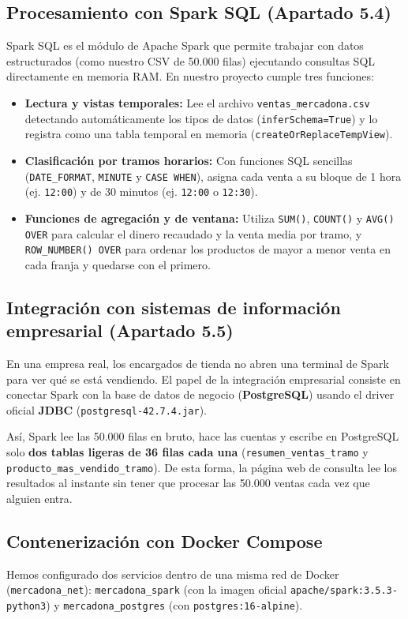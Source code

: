 \documentclass[a4paper,12pt]{article}
\begin{document}
\subsection{Procesamiento con Spark SQL (Apartado 5.4)}
Spark SQL es el módulo de Apache Spark que permite trabajar con datos estructurados (como nuestro CSV de 50.000 filas) ejecutando consultas SQL directamente en memoria RAM. En nuestro proyecto cumple tres funciones:
\begin{itemize}[leftmargin=1.0cm]
    \item \textbf{Lectura y vistas temporales:} Lee el archivo \texttt{ventas\_mercadona.csv} detectando automáticamente los tipos de datos (\texttt{inferSchema=True}) y lo registra como una tabla temporal en memoria (\texttt{createOrReplaceTempView}).
    \item \textbf{Clasificación por tramos horarios:} Con funciones SQL sencillas (\texttt{DATE\_FORMAT}, \texttt{MINUTE} y \texttt{CASE WHEN}), asigna cada venta a su bloque de 1 hora (ej. \texttt{12:00}) y de 30 minutos (ej. \texttt{12:00} o \texttt{12:30}).
    \item \textbf{Funciones de agregación y de ventana:} Utiliza \texttt{SUM()}, \texttt{COUNT()} y \texttt{AVG() OVER} para calcular el dinero recaudado y la venta media por tramo, y \texttt{ROW\_NUMBER() OVER} para ordenar los productos de mayor a menor venta en cada franja y quedarse con el primero.
\end{itemize}

\subsection{Integración con sistemas de información empresarial (Apartado 5.5)}
En una empresa real, los encargados de tienda no abren una terminal de Spark para ver qué se está vendiendo. El papel de la integración empresarial consiste en conectar Spark con la base de datos de negocio (\textbf{PostgreSQL}) usando el driver oficial \textbf{JDBC} (\texttt{postgresql-42.7.4.jar}).

Así, Spark lee las 50.000 filas en bruto, hace las cuentas y escribe en PostgreSQL solo \textbf{dos tablas ligeras de 36 filas cada una} (\texttt{resumen\_ventas\_tramo} y \texttt{producto\_mas\_vendido\_tramo}). De esta forma, la página web de consulta lee los resultados al instante sin tener que procesar las 50.000 ventas cada vez que alguien entra.

\subsection{Contenerización con Docker Compose}
Hemos configurado dos servicios dentro de una misma red de Docker (\texttt{mercadona\_net}): \texttt{mercadona\_spark} (con la imagen oficial \texttt{apache/spark:3.5.3-python3}) y \texttt{mercadona\_postgres} (con \texttt{postgres:16-alpine}).
\end{document}
